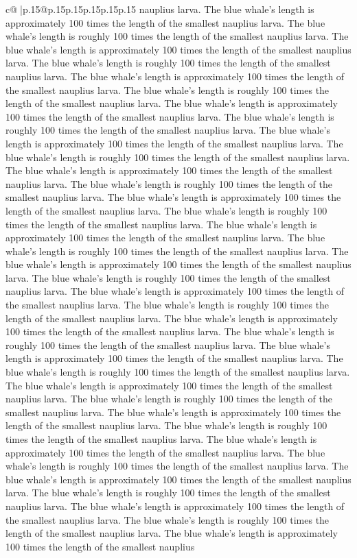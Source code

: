 \documentclass{article}
\begin{document}
{\begin{supertabular}{c@{$\;$}|p{.15\linewidth}@{}p{.15\linewidth}p{.15\linewidth}p{.15\linewidth}p{.15\linewidth}p{.15\linewidth}}
{{{nauplius larva. The blue whale's length is approximately 100 times the length of the smallest nauplius larva. The blue whale's length is roughly 100 times the length of the smallest nauplius larva. The blue whale's length is approximately 100 times the length of the smallest nauplius larva. The blue whale's length is roughly 100 times the length of the smallest nauplius larva. The blue whale's length is approximately 100 times the length of the smallest nauplius larva. The blue whale's length is roughly 100 times the length of the smallest nauplius larva. The blue whale's length is approximately 100 times the length of the smallest nauplius larva. The blue whale's length is roughly 100 times the length of the smallest nauplius larva. The blue whale's length is approximately 100 times the length of the smallest nauplius larva. The blue whale's length is roughly 100 times the length of the smallest nauplius larva. The blue whale's length is approximately 100 times the length of the smallest nauplius larva. The blue whale's length is roughly 100 times the length of the smallest nauplius larva. The blue whale's length is approximately 100 times the length of the smallest nauplius larva. The blue whale's length is roughly 100 times the length of the smallest nauplius larva. The blue whale's length is approximately 100 times the length of the smallest nauplius larva. The blue whale's length is roughly 100 times the length of the smallest nauplius larva. The blue whale's length is approximately 100 times the length of the smallest nauplius larva. The blue whale's length is roughly 100 times the length of the smallest nauplius larva. The blue whale's length is approximately 100 times the length of the smallest nauplius larva. The blue whale's length is roughly 100 times the length of the smallest nauplius larva. The blue whale's length is approximately 100 times the length of the smallest nauplius larva. The blue whale's length is roughly 100 times the length of the smallest nauplius larva. The blue whale's length is approximately 100 times the length of the smallest nauplius larva. The blue whale's length is roughly 100 times the length of the smallest nauplius larva. The blue whale's length is approximately 100 times the length of the smallest nauplius larva. The blue whale's length is roughly 100 times the length of the smallest nauplius larva. The blue whale's length is approximately 100 times the length of the smallest nauplius larva. The blue whale's length is roughly 100 times the length of the smallest nauplius larva. The blue whale's length is approximately 100 times the length of the smallest nauplius larva. The blue whale's length is roughly 100 times the length of the smallest nauplius larva. The blue whale's length is approximately 100 times the length of the smallest nauplius larva. The blue whale's length is roughly 100 times the length of the smallest nauplius larva. The blue whale's length is approximately 100 times the length of the smallest nauplius larva. The blue whale's length is roughly 100 times the length of the smallest nauplius larva. The blue whale's length is approximately 100 times the length of the smallest nauplius }}}
\end{supertabular}}
\end{document}
